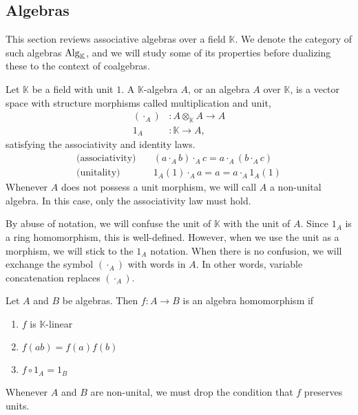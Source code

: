 \documentclass[../thesis.tex]{subfiles}
\begin{document}
    \subsection{Algebras}

            This section reviews associative algebras over a field $\mathbb{K}$. We denote the category of such algebras $\tt{Alg}_\mathbb{K}$, and we will study some of its properties before dualizing these to the context of coalgebras.
            
            \begin{definition}
                Let $\mathbb{K}$ be a field with unit $1$. A $\mathbb{K}$-algebra $A$, or an algebra $A$ over $\mathbb{K}$, is a vector space with structure morphisms called multiplication and unit,
                \begin{align*}
                    (\cdot_A) & : A\otimes_{\mathbb{K}}A \rightarrow A \\
                    1_A & : \mathbb{K} \rightarrow A,
                \end{align*}
                satisfying the associativity and identity laws. 
                \begin{align*}
                    \text{(associativity)}\quad & (a \cdot_A b) \cdot_A c = a \cdot_A (b \cdot_A c) \\
                    \text{(unitality)}\quad & 1_A(1) \cdot_A a = a = a \cdot_A 1_A(1)
                \end{align*}
                Whenever $A$ does not possess a unit morphism, we will call $A$ a non-unital algebra. In this case, only the associativity law must hold.
            \end{definition}

            By abuse of notation, we will confuse the unit of $\mathbb{K}$ with the unit of $A$. Since $1_A$ is a ring homomorphism, this is well-defined. However, when we use the unit as a morphism, we will stick to the $1_A$ notation. When there is no confusion, we will exchange the symbol $(\cdot_A)$ with words in $A$. In other words, variable concatenation replaces $(\cdot_A)$.

            \begin{definition}
                Let $A$ and $B$ be algebras. Then $f: A\rightarrow B$ is an algebra homomorphism if
                \begin{enumerate}
                    \item $f$ is $\mathbb{K}$-linear
                    \item $f(ab)=f(a)f(b)$
                    \item $f\circ 1_A = 1_B$
                \end{enumerate}
                Whenever $A$ and $B$ are non-unital, we must drop the condition that $f$ preserves units.
            \end{definition}
\end{document}
